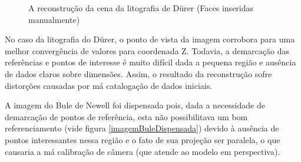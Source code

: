 			\begin{figure}[!htb]
				\centering
				\quad
				\quad
				\caption{A reconstrução da cena da litografia de Dürer (Faces inseridas manualmente)}
				\label{resultadosDurerTriplo}
			\end{figure}
			
			No caso da litografia do Dürer, o ponto de vista da imagem corrobora para uma melhor convergência de valores para coordenada Z. Todavia, a demarcação das referências e pontos de interesse é muito difícil dada a pequena região e ausência de dados claros sobre dimensões. Assim, o resultado da reconstrução sofre distorções causadas por má catalogação de dados iniciais.
			
			A imagem do Bule de Newell foi dispensada pois, dada a necessidade de demarcação de pontos de referência, esta não possibilitava um bom referenciamento (vide figura \ref{imagemBuleDispensada}) devido à ausência de pontos interessantes nessa região e o fato de sua projeção ser paralela, o que causaria a má calibração de câmera (que atende ao modelo em perspectiva).
			
